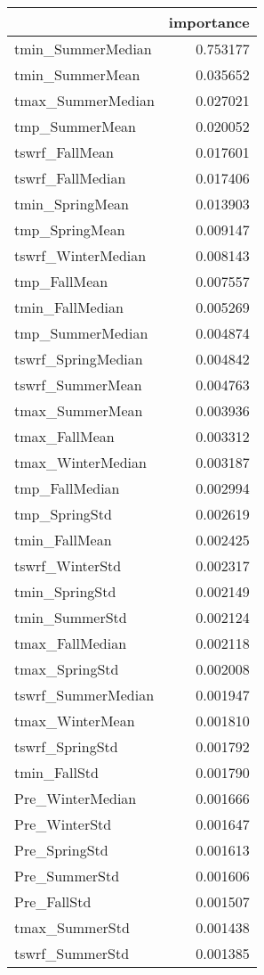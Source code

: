 \begin{tabular}{lr}
\toprule
 & importance \\
\midrule
tmin_SummerMedian & 0.753177 \\
tmin_SummerMean & 0.035652 \\
tmax_SummerMedian & 0.027021 \\
tmp_SummerMean & 0.020052 \\
tswrf_FallMean & 0.017601 \\
tswrf_FallMedian & 0.017406 \\
tmin_SpringMean & 0.013903 \\
tmp_SpringMean & 0.009147 \\
tswrf_WinterMedian & 0.008143 \\
tmp_FallMean & 0.007557 \\
tmin_FallMedian & 0.005269 \\
tmp_SummerMedian & 0.004874 \\
tswrf_SpringMedian & 0.004842 \\
tswrf_SummerMean & 0.004763 \\
tmax_SummerMean & 0.003936 \\
tmax_FallMean & 0.003312 \\
tmax_WinterMedian & 0.003187 \\
tmp_FallMedian & 0.002994 \\
tmp_SpringStd & 0.002619 \\
tmin_FallMean & 0.002425 \\
tswrf_WinterStd & 0.002317 \\
tmin_SpringStd & 0.002149 \\
tmin_SummerStd & 0.002124 \\
tmax_FallMedian & 0.002118 \\
tmax_SpringStd & 0.002008 \\
tswrf_SummerMedian & 0.001947 \\
tmax_WinterMean & 0.001810 \\
tswrf_SpringStd & 0.001792 \\
tmin_FallStd & 0.001790 \\
Pre_WinterMedian & 0.001666 \\
Pre_WinterStd & 0.001647 \\
Pre_SpringStd & 0.001613 \\
Pre_SummerStd & 0.001606 \\
Pre_FallStd & 0.001507 \\
tmax_SummerStd & 0.001438 \\
tswrf_SummerStd & 0.001385 \\

\end{tabular}

